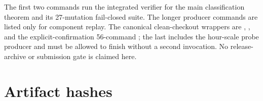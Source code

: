 \documentclass[10pt]{article}
\begin{document}
The first two commands run the integrated verifier for the main classification
theorem and its 27-mutation fail-closed suite.  The longer producer commands
are listed only for component replay.  The canonical clean-checkout wrappers are
,
, and the explicit-confirmation
56-command ; the last includes
the hour-scale probe producer and must be allowed to finish without a second
invocation.  No release-archive or submission gate is claimed here.

\section{Artifact hashes}

\begingroup
\footnotesize
\setlength{\tabcolsep}{4pt}
\renewcommand{\arraystretch}{.8}
\end{document}
